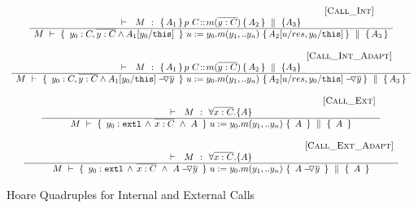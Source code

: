 {\begin{figure}[htb]
$\begin{array}{c}
 \inferruleSD{\hspace{4.7cm} [\sc{Call\_Int}]}
	{
	   	\begin{array}{l}
		\promises  M {\mprepostN{A_1}{p\ C}{m}{y}{C}{A_2} {A_3}}  
          	\end{array}
		}
	{  \hprovesN {M} 
						{ \  y_0:C,\overline {y:C} \wedge  A_1[y_0/\prg{this}] \ }
						 { \ u:=y_0.m(y_1,.. y_n)\    }
					         { A_2[ u/res,y_0/\prg{this}] } 
						{   A_3  }	
}
 \\
\\
{ \inferruleSD{\hspace{4.7cm} [\sc{Call\_Int\_Adapt}]}
	{
	   	\begin{array}{l}
		\promises  M {\mprepostN{A_1}{p\ C}{m}{y}{C}{A_2} {A_3}}  
          	\end{array}
		}
	{  \hprovesN {M} 
						{ \  y_0:C, \overline {y:C} \wedge {\PushAS {y}{A_1[y_0/\prg{this}]}}  \ }  
						{ \ u:=y_0.m(y_1,.. y_n)\    }
						{  { \PushAS {y}{A_2[ u/res,y_0/\prg{this}]}}   }
						{   A_3  }	
}
}
\\
 \\ 
 \inferruleSD{\hspace{4.7cm} [\sc{Call\_Ext}]}
 	{ 
   	 \promises M   {\TwoStatesN {\overline {x:C}} {A}} 
        }
	{   \hprovesN{M} 
						{ \    { \external{y_0}} \,     \wedge \,  \overline{x:C}\  \wedge\ {{A}}\ }  
						{ \ u:=y_0.m(y_1,.. y_n)\    }
						{ \   {{A}}  \ }
						{\  A \   }	
}
\\
 \\ 
 \inferruleSD{\hspace{4.7cm} [\sc{Call\_Ext}\_Adapt]}
 	{ 
   	 \promises M   {\TwoStatesN {\overline {x:C}} {A}} 
        }
	{   \hprovesN{M} 
						{ \    { \external{y_0}} \,     \wedge \,  \overline{x:C}\  \wedge\ {\PushAS {y}{A}}\ }  
						{ \ u:=y_0.m(y_1,.. y_n)\    }
						{ \   {\PushAS {y}{A}}  \ }
						{\  A \   }	
}

\end{array}
$
\caption{Hoare Quadruples for Internal and External Calls}
\label{f:internal:calls}
\label{f:external:calls}
\label{f:calls}
\end{figure}

}
